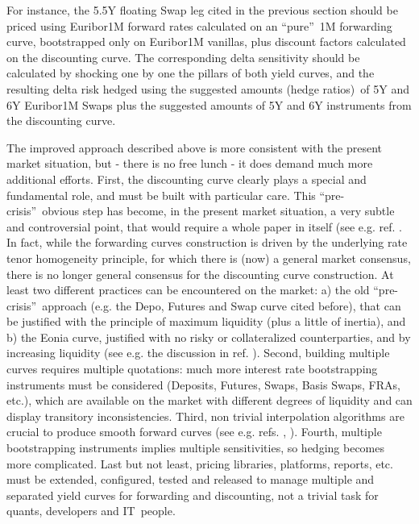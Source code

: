 \documentclass[11pt,reqno]{amsart}
\begin{document}
\par
For instance, the 5.5Y floating Swap leg cited in the previous section should be priced using Euribor1M forward rates calculated on an \textquotedblleft pure\textquotedblright\ 1M forwarding curve, bootstrapped only on Euribor1M vanillas, plus discount factors calculated on the discounting curve. The corresponding delta sensitivity should be calculated by shocking one by one the pillars of both yield curves, and the resulting delta risk hedged using the suggested amounts (hedge ratios)\ of 5Y and 6Y Euribor1M Swaps plus the suggested amounts of 5Y and 6Y instruments from the discounting curve.
\par
The improved approach described above is more consistent with the present market situation, but - there is no free lunch - it does demand much more additional efforts. First, the discounting curve clearly plays a special and fundamental role, and must be built with particular care. This \textquotedblleft pre-crisis\textquotedblright\ obvious step has become, in the present market situation, a very subtle and controversial point, that would require a whole paper in itself (see e.g. ref. \cite{Hen07}. In fact, while the forwarding curves construction is driven by the underlying rate tenor homogeneity principle, for which there is (now) a general market consensus, there is no longer general consensus for the discounting curve construction. At least two different practices can be encountered on the market: a) the old
\textquotedblleft pre-crisis\textquotedblright\ approach (e.g. the Depo, Futures and Swap curve cited before), that can be justified with the principle of maximum liquidity (plus a little of inertia), and b) the Eonia curve, justified with no risky or collateralized counterparties, and by increasing liquidity (see e.g. the discussion in ref. \cite{Mad08}).
Second, building multiple curves requires multiple quotations: much more interest rate bootstrapping instruments must be considered (Deposits, Futures, Swaps, Basis Swaps, FRAs, etc.), which are available on the market with different degrees of liquidity and can display transitory inconsistencies.
Third, non trivial interpolation algorithms are crucial to produce smooth forward curves (see e.g. refs. \cite{HagWes08}, \cite{And07}).
Fourth, multiple bootstrapping instruments implies multiple sensitivities, so hedging becomes more complicated. Last but not least, pricing libraries, platforms, reports, etc. must be extended, configured, tested and released to manage multiple and separated yield curves for forwarding and discounting, not a trivial task for quants, developers and IT\ people.
\end{document}
